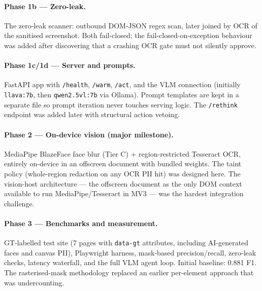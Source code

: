\documentclass[11pt,a4paper]{article}
\newcommand{\code}[1]{\texttt{#1}}
\begin{document}
\paragraph{Phase 1b --- Zero-leak.}
The zero-leak scanner: outbound DOM-JSON regex scan, later joined by OCR of the sanitised screenshot. Both fail-closed; the fail-closed-on-exception behaviour was added after discovering that a crashing OCR gate must not silently approve.

\paragraph{Phase 1c/1d --- Server and prompts.}
FastAPI app with \code{/health}, \code{/warm}, \code{/act}, and the VLM connection (initially \code{llava:7b}, then \code{qwen2.5vl:7b} via Ollama). Prompt templates are kept in a separate file so prompt iteration never touches serving logic. The \code{/rethink} endpoint was added later with structural action vetoing.

\paragraph{Phase 2 --- On-device vision (major milestone).}
MediaPipe BlazeFace face blur (Tier C) + region-restricted Tesseract OCR, entirely on-device in an offscreen document with bundled weights. The taint policy (whole-region redaction on any OCR PII hit) was designed here. The vision-host architecture --- the offscreen document as the only DOM context available to run MediaPipe/Tesseract in MV3 --- was the hardest integration challenge.

\paragraph{Phase 3 --- Benchmarks and measurement.}
GT-labelled test site (7 pages with \code{data-gt} attributes, including AI-generated faces and canvas PII), Playwright harness, mask-based precision/recall, zero-leak checks, latency waterfall, and the full VLM agent loop. Initial baseline: 0.881 F1. The rasterised-mask methodology replaced an earlier per-element approach that was undercounting.
\end{document}

